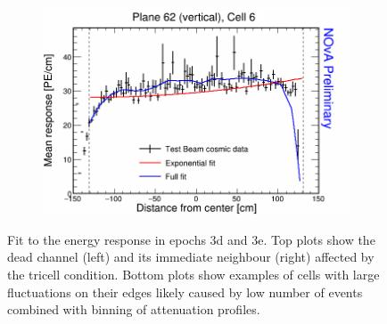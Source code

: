 \begin{figure}[h]
\begin{subfigure}{0.495\textwidth}
  \end{subfigure}
  \begin{subfigure}{0.495\textwidth}
    \includegraphics[width=\linewidth]{Plots/RelativeCalibrationResults/ep3de_062_006.png}
  \end{subfigure}  
  \caption[Attenuation fits for dead channels cells in period 3 data]{Fit to the energy response in epochs 3d and 3e. Top plots show the dead channel (left) and its immediate neighbour (right) affected by the tricell condition. Bottom plots show examples of cells with large fluctuations on their edges likely caused by low number of events combined with binning of attenuation profiles.}
  \label{fig:AttenfitResultsEpoch3de_LeftoverUnderfilledCell}
\end{figure}

